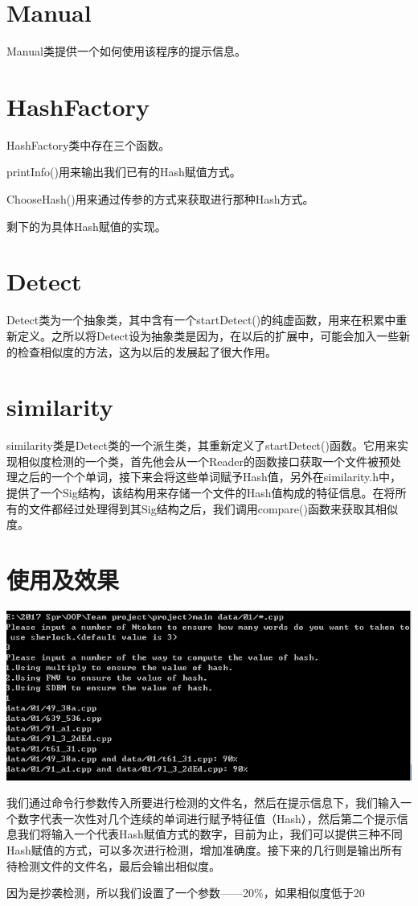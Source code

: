 \section{Manual}
Manual类提供一个如何使用该程序的提示信息。

\section{HashFactory}
HashFactory类中存在三个函数。

printInfo()用来输出我们已有的Hash赋值方式。

ChooseHash()用来通过传参的方式来获取进行那种Hash方式。

剩下的为具体Hash赋值的实现。

\section{Detect}
Detect类为一个抽象类，其中含有一个startDetect()的纯虚函数，用来在积累中重新定义。之所以将Detect设为抽象类是因为，在以后的扩展中，可能会加入一些新的检查相似度的方法，这为以后的发展起了很大作用。

\section{similarity}
similarity类是Detect类的一个派生类，其重新定义了startDetect()函数。它用来实现相似度检测的一个类，首先他会从一个Reader的函数接口获取一个文件被预处理之后的一个个单词，接下来会将这些单词赋予Hash值，另外在similarity.h中，提供了一个Sig结构，该结构用来存储一个文件的Hash值构成的特征信息。在将所有的文件都经过处理得到其Sig结构之后，我们调用compare()函数来获取其相似度。

\section{使用及效果}
\begin{center}
\includegraphics{command.PNG}
\end{center}

我们通过命令行参数传入所要进行检测的文件名，然后在提示信息下，我们输入一个数字代表一次性对几个连续的单词进行赋予特征值（Hash），然后第二个提示信息我们将输入一个代表Hash赋值方式的数字，目前为止，我们可以提供三种不同Hash赋值的方式，可以多次进行检测，增加准确度。接下来的几行则是输出所有待检测文件的文件名，最后会输出相似度。

因为是抄袭检测，所以我们设置了一个参数——20\%，如果相似度低于20%

\newpage
